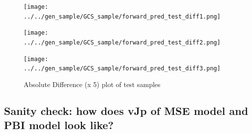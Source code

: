 \documentclass[
]{article}
\begin{document}
\begin{figure}

\begin{minipage}{\linewidth}

\texttt{[image: ../../gen\_sample/GCS\_sample/forward\_pred\_test\_diff1.png]}

\end{minipage}%
\newline
\begin{minipage}{\linewidth}

\texttt{[image: ../../gen\_sample/GCS\_sample/forward\_pred\_test\_diff2.png]}

\end{minipage}%
\newline
\begin{minipage}{\linewidth}

\texttt{[image: ../../gen\_sample/GCS\_sample/forward\_pred\_test\_diff3.png]}

\end{minipage}%

\caption{\label{fig-eig1000}Absolute Difference (x 5) plot of test
samples}

\end{figure}%

\subsection{Sanity check: how does vJp of MSE model and PBI model look
like?}\label{sanity-check-how-does-vjp-of-mse-model-and-pbi-model-look-like}
\end{document}
